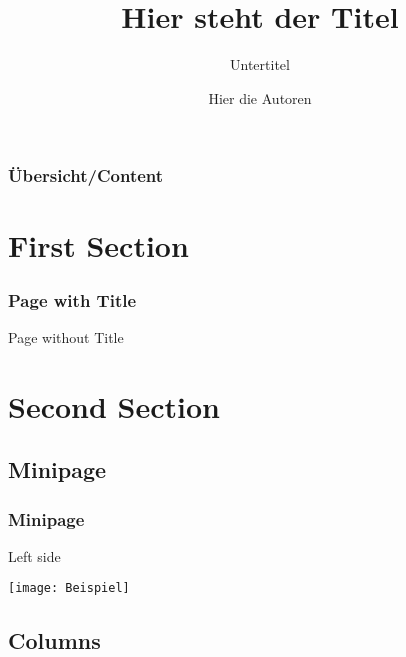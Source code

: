 \documentclass{beamer}
\title[Kurzform Titel]{Hier steht der Titel}
\subtitle{Untertitel}
\author[Kurzform der Autoren]{Hier die Autoren}
\institute[Kurzform]{Zugehörigkeit}
\begin{document}
\begin{frame}
	\frametitle{Übersicht/Content}
	\tableofcontents[pausesections]
\end{frame}



\section{First Section}


\begin{frame}
\frametitle{Page with Title}
\end{frame}

\begin{frame}
Page without Title
\end{frame}



\section{Second Section}

\subsection{Minipage}

\begin{frame}
\frametitle{Minipage}
\begin{minipage}{0.45\textwidth}
	Left side
\end{minipage}	
\hfill
\begin{minipage}{0.49\textwidth}
	\texttt{[image: Beispiel]}
\end{minipage}
\end{frame}

\subsection{Columns}
\end{document}
